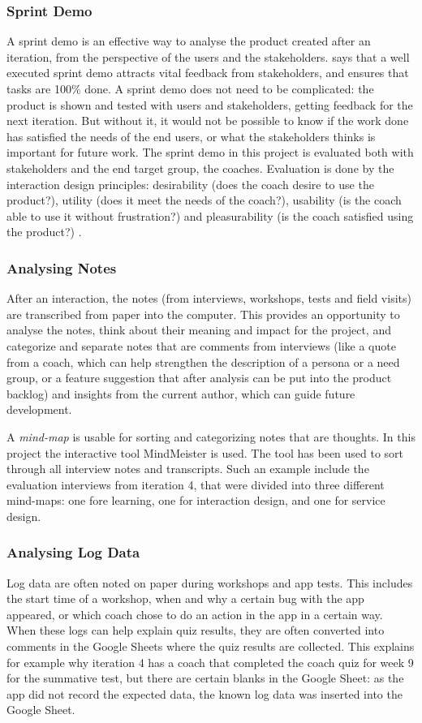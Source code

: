 \subsubsection{Sprint Demo}
A sprint demo is an effective way to analyse the product created after an iteration, from the perspective of the users and the stakeholders. \cite{kniberg} says that a well executed sprint demo attracts vital feedback from stakeholders, and ensures that tasks are 100\% done. A sprint demo does not need to be complicated: the product is shown and tested with users and stakeholders, getting feedback for the next iteration. But without it, it would not be possible to know if the work done has satisfied the needs of the end users, or what the stakeholders thinks is important for future work. The sprint demo in this project is evaluated both with stakeholders and the end target group, the coaches. Evaluation is done by the interaction design principles: desirability (does the coach desire to use the product?), utility (does it meet the needs of the coach?), usability (is the coach able to use it without frustration?) and pleasurability (is the coach satisfied using the product?) \citep{clatworthy}.

\subsubsection{Analysing Notes}
After an interaction, the notes (from interviews, workshops, tests and field visits) are transcribed from paper into the computer. This provides an opportunity to analyse the notes, think about their meaning and impact for the project, and categorize and separate notes that are comments from interviews (like a quote from a coach, which can help strengthen the description of a persona or a need group, or a feature suggestion that after analysis can be put into the product backlog) and insights from the current author, which can guide future development.

A \textit{mind-map} is usable for sorting and categorizing notes that are thoughts. In this project the interactive tool MindMeister \citep{mindmeister} is used. The tool has been used to sort through all interview notes and transcripts. Such an example include the evaluation interviews from iteration 4, that were divided into three different mind-maps: one fore learning, one for interaction design, and one for service design.

\subsubsection{Analysing Log Data}
Log data are often noted on paper during workshops and app tests. This includes the start time of a workshop, when and why a certain bug with the app appeared, or which coach chose to do an action in the app in a certain way. When these logs can help explain quiz results, they are often converted into comments in the Google Sheets where the quiz results are collected. This explains for example why iteration 4 has a coach that completed the coach quiz for week 9 for the summative test, but there are certain blanks in the Google Sheet: as the app did not record the expected data, the known log data was inserted into the Google Sheet.

